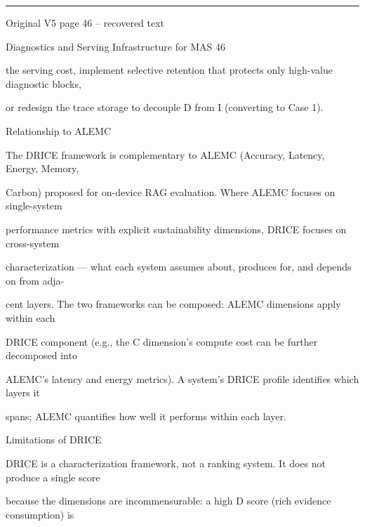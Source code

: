 \par\smallskip\noindent\rule{\textwidth}{0.4pt}\par{\sffamily\footnotesize Original V5 page 46 -- recovered text}\par\begin{flushleft}\footnotesize\ttfamily
\par\smallskip
\par\smallskip
\noindent Diagnostics and Serving Infrastructure for MAS 46\par
\par\smallskip
\par\smallskip
\par\smallskip
\noindent the serving cost, implement selective retention that protects only high-value diagnostic blocks,\par
\noindent or redesign the trace storage to decouple D from I (converting to Case 1).\par
\par\smallskip
{} Relationship to ALEMC\par
\noindent The DRICE framework is complementary to ALEMC (Accuracy, Latency, Energy, Memory,\par
\noindent Carbon) proposed for on-device RAG evaluation. Where ALEMC focuses on single-system\par
\noindent performance metrics with explicit sustainability dimensions, DRICE focuses on cross-system\par
\noindent characterization — what each system assumes about, produces for, and depends on from adja-\par
\noindent cent layers. The two frameworks can be composed: ALEMC dimensions apply within each\par
\noindent DRICE component (e.g., the C dimension’s compute cost can be further decomposed into\par
\noindent ALEMC’s latency and energy metrics). A system’s DRICE profile identifies which layers it\par
\noindent spans; ALEMC quantifies how well it performs within each layer.\par
\par\smallskip
{} Limitations of DRICE\par
\noindent DRICE is a characterization framework, not a ranking system. It does not produce a single score\par
\noindent because the dimensions are incommensurable: a high D score (rich evidence consumption) is\par

\end{flushleft}
